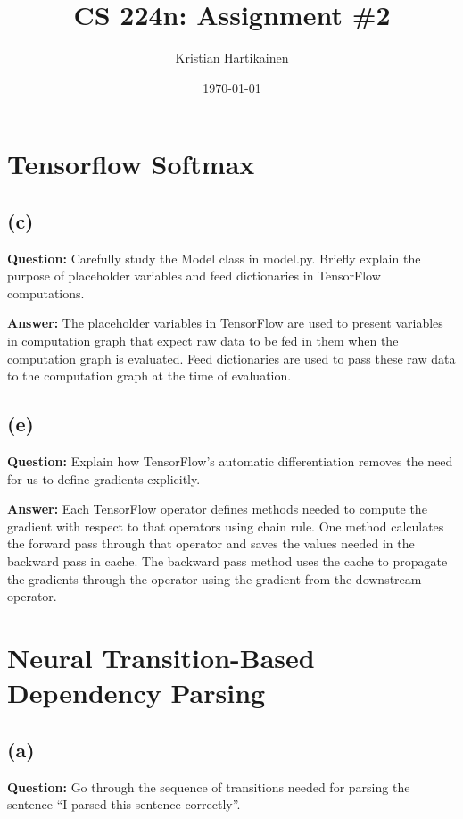 \documentclass[11pt]{article}
\title{ CS 224n: Assignment \#2 }
\author{Kristian Hartikainen}
\date{\today}
\begin{document}
\maketitle

\section{Tensorflow Softmax}
\subsection*{(c)}
\textbf{Question:} Carefully study the Model class in model.py. Briefly explain the purpose
of placeholder variables and feed dictionaries in TensorFlow computations.

\textbf{Answer:} The placeholder variables in TensorFlow are used to present variables in computation graph that expect raw data to be fed in them when the computation graph is evaluated. Feed dictionaries are used to pass these raw data to the computation graph at the time of evaluation.

\subsection*{(e)}
\textbf{Question:} Explain how TensorFlow’s automatic differentiation removes the need for us to define gradients explicitly.

\textbf{Answer:} Each TensorFlow operator defines methods needed to compute the gradient with respect to that operators using chain rule. One method calculates the forward pass through that operator and saves the values needed in the backward pass in cache. The backward pass method uses the cache to propagate the gradients through the operator using the gradient from the downstream operator.

\section{Neural Transition-Based Dependency Parsing}
\subsection*{(a)}
\textbf{Question:} Go through the sequence of transitions needed for parsing the sentence “I parsed this sentence correctly”.
\end{document}
